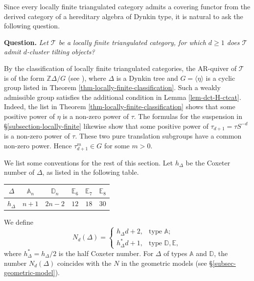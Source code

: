 \documentclass[12pt]{article}
\theoremstyle{plain}
\theoremstyle{definition}
\newcommand{\T}{\mathcal{T}}
\renewcommand{\geq}{\geqslant}
\begin{document}
Since every locally finite triangulated category admits a covering functor from the derived category of a hereditary algebra of Dynkin type, it is natural to ask the following question. 

\medskip 
\noindent
{\bf Question.} {\em Let $\T$ be a locally finite triangulated category, for which $d\geq 1$ does $\T$ admit $d$-cluster tilting objects?}

\medskip 
By the classification of locally finite triangulated categories, the AR-quiver of $\T$ is  of the form $\mathbb{Z}\Delta/G$ (see \cite{Xiao2005,Amiot2007}), where $\Delta$ is a Dynkin tree and $G=\langle\eta\rangle$ is a cyclic group listed in Theorem \ref{thm-locally-finite-classification}.  Such a weakly admissible group satisfies the additional condition in Lemma \ref{lem-dct-H-ctcat}.  Indeed, the list in Theorem \ref{thm-locally-finite-classification} shows that some positive power of \(\eta\) is a non-zero power of \(\tau\).  The formulas for the suspension in \S\ref{subsection-locally-finite} likewise show that some positive power of \(\tau_{d+1}=\tau S^{-d}\) is a non-zero power of \(\tau\).  These two pure translation subgroups have a common non-zero power.  Hence \(\tau_{d+1}^m\in G\) for some \(m>0\).

We list some conventions for the rest of this section. Let $h_{\Delta}$ be the Coxeter number of $\Delta$, as listed in the following table. 
\begin{center}
\begin{tabular}{c|c|c|c|c|c}
\toprule  
$\Delta$ & $\mathbb{A}_n$ & $\mathbb{D}_n$ & $\mathbb{E}_6$ & $\mathbb{E}_7$ & $\mathbb{E}_8$ \\
\hline
$h_{\Delta}$ & $n+1$ & $2n-2$ & $12$ & $18$ & $30$\\
\bottomrule
\end{tabular}
\vspace{0.5em}
\label{tab:coxeter-numbers}
\end{center} 
We define 
\[N_d(\Delta)=\begin{cases}
    h_{\Delta}d+2, & \text{type }\mathbb{A};\\
    h_{\Delta}^*d+1, & \text{type }\mathbb{D},\mathbb{E},
\end{cases}\tag{$3.1$}\label{def-N}\]
where $h_{\Delta}^*=h_{\Delta}/2$ is the half Coxeter number. For  $\Delta$ of types $\mathbb{A}$ and $\mathbb{D}$, the number $N_d(\Delta)$ coincides with the $N$ in the geometric models (see \S\ref{subsec-geometric-model}). 
\end{document}
